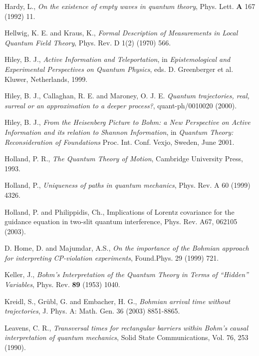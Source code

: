 \begin{thebibliography}{10}
 Hardy, L., {\em On the existence of empty waves in quantum theory}, Phys. Lett. {\bf A} 167 (1992) 11.
 

 Hellwig, K. E. and Kraus, K., {\em Formal Description of Measurements in Local Quantum Field Theory}, Phys. Rev. D 1(2) 
  (1970) 566.

 Hiley, B. J., {\em Active Information and Teleportation}, in {\em 
Epistemological and Experimental Perspectives on Quantum Physics}, eds. D. Greenberger 
et al. Kluwer, Netherlands, 1999.

 Hiley, B. J., Callaghan, R. E. and Maroney, O. J. E.
  {\em Quantum trajectories, real, surreal or an approximation to a deeper 
  process?}, quant-ph/0010020 (2000).

 Hiley, B. J., {\em From the Heisenberg Picture to Bohm: a New Perspective on Active Information and its 
  relation to Shannon Information}, in {\em Quantum Theory: Reconsideration of Foundations} Proc. Int. Conf. Vexjo, Sweden, 
  June 2001.

 Holland, P. R., {\em The Quantum Theory of Motion}, Cambridge
  University Press, 1993.

 Holland, P., {\em Uniqueness of paths in quantum mechanics}, Phys. Rev. A 60 (1999) 4326.

 Holland, P. and Philippidis, Ch., {Implications of Lorentz covariance for the guidance equation in two-slit 
quantum interference}, Phys. Rev. A67, 062105 (2003). 

 D. Home, D. and Majumdar, A.S., {\em On the importance of the Bohmian approach for interpreting CP-violation experiments}, 
Found.Phys. 29 (1999) 721.

 Keller, J., {\em Bohm's Interpretation of the Quantum Theory in Terms of ``Hidden'' Variables}, Phys. Rev. 
{\bf 89} (1953) 1040.

 Kreidl, S., Gr\"ubl, G. and Embacher, H. G., {\em Bohmian arrival time without trajectories}, J. Phys. 
A: Math. Gen. 36 (2003) 8851-8865.

 Leavens, C. R., {\em Transversal times for rectangular 
  barriers  within Bohm's causal interpretation of quantum mechanics}, 
  Solid State Communications, Vol. 76, 253 (1990).


\end{thebibliography}
